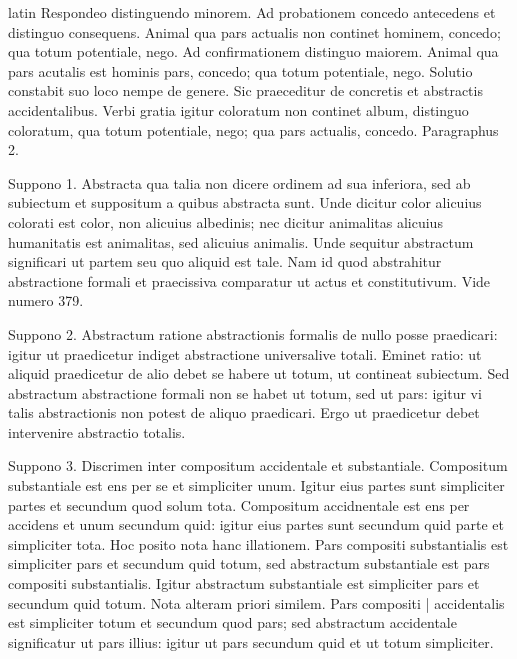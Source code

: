 \begin{otherlanguage*}{latin}
\pstart
Respondeo distinguendo minorem. Ad probationem concedo antecedens et distinguo consequens. Animal qua pars actualis non continet hominem, concedo; qua totum potentiale, nego. Ad confirmationem distinguo maiorem. Animal qua pars acutalis est hominis pars, concedo; qua totum potentiale, nego. Solutio constabit suo loco nempe de genere. Sic praeceditur de concretis et abstractis accidentalibus. Verbi gratia igitur coloratum non continet album, distinguo coloratum, qua totum potentiale, nego; qua pars actualis, concedo. Paragraphus 2. 
\pend

\pstart
{}
\pend

\pstart
Suppono 1. Abstracta qua talia non dicere ordinem ad sua inferiora, sed ab subiectum et suppositum a quibus abstracta sunt. Unde dicitur color alicuius colorati est color, non alicuius albedinis; nec dicitur animalitas alicuius humanitatis est animalitas, sed alicuius animalis. Unde sequitur abstractum significari ut partem seu quo aliquid est tale. Nam id quod abstrahitur abstractione formali et praecissiva comparatur ut actus et constitutivum. Vide numero 379. 
\pend

\pstart
Suppono 2. Abstractum ratione abstractionis formalis de nullo posse praedicari:
igitur ut praedicetur indiget abstractione universalive totali. Eminet ratio:
ut aliquid praedicetur de alio debet se habere ut totum, ut contineat subiectum. Sed abstractum abstractione formali non se habet ut totum, sed ut pars:
igitur vi talis abstractionis non potest de aliquo praedicari. Ergo ut praedicetur debet intervenire abstractio totalis. 
\pend

\pstart
Suppono 3. Discrimen inter compositum accidentale et substantiale. Compositum substantiale est ens per se et simpliciter unum. Igitur eius partes sunt simpliciter partes et secundum quod solum tota. Compositum accidnentale est ens per accidens et unum secundum quid:
igitur eius partes sunt secundum quid parte et simpliciter tota. Hoc posito nota hanc illationem. Pars compositi substantialis est simpliciter pars et secundum quid totum, sed abstractum substantiale est pars compositi substantialis. Igitur abstractum substantiale est simpliciter pars et secundum quid totum. Nota alteram priori similem. Pars compositi \textnormal{|} accidentalis est simpliciter totum et secundum quod pars; sed abstractum accidentale significatur ut pars illius:
igitur ut pars secundum quid et ut totum simpliciter. 
\pend


\end{otherlanguage*}
